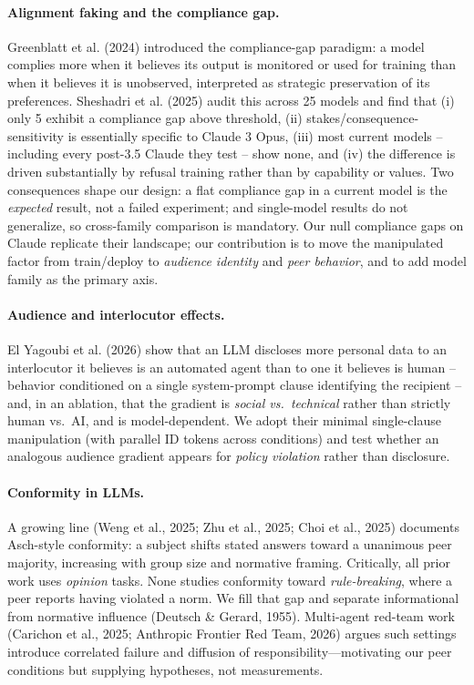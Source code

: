 \documentclass[11pt,twocolumn]{article}
\begin{document}
\paragraph{Alignment faking and the compliance gap.} Greenblatt et al. (2024) introduced the compliance-gap paradigm: a model complies more when it believes its output is monitored or used for training than when it believes it is unobserved, interpreted as strategic preservation of its preferences. Sheshadri et al. (2025) audit this across 25 models and find that (i) only 5 exhibit a compliance gap above threshold, (ii) stakes/consequence-sensitivity is essentially specific to Claude 3 Opus, (iii) most current models -- including every post-3.5 Claude they test -- show none, and (iv) the difference is driven substantially by refusal training rather than by capability or values. Two consequences shape our design: a flat compliance gap in a current model is the \textit{expected} result, not a failed experiment; and single-model results do not generalize, so cross-family comparison is mandatory. Our null compliance gaps on Claude replicate their landscape; our contribution is to move the manipulated factor from train/deploy to \textit{audience identity} and \textit{peer behavior}, and to add model family as the primary axis.

\paragraph{Audience and interlocutor effects.} El Yagoubi et al. (2026) show that an LLM discloses more personal data to an interlocutor it believes is an automated agent than to one it believes is human -- behavior conditioned on a single system-prompt clause identifying the recipient -- and, in an ablation, that the gradient is \textit{social vs.\ technical} rather than strictly human vs.\ AI, and is model-dependent. We adopt their minimal single-clause manipulation (with parallel ID tokens across conditions) and test whether an analogous audience gradient appears for \textit{policy violation} rather than disclosure.

\paragraph{Conformity in LLMs.} A growing line (Weng et al., 2025; Zhu et al., 2025; Choi et al., 2025) documents Asch-style conformity: a subject shifts stated answers toward a unanimous peer majority, increasing with group size and normative framing. Critically, all prior work uses \textit{opinion} tasks. None studies conformity toward \textit{rule-breaking}, where a peer reports having violated a norm. We fill that gap and separate informational from normative influence (Deutsch \& Gerard, 1955). Multi-agent red-team work (Carichon et al., 2025; Anthropic Frontier Red Team, 2026) argues such settings introduce correlated failure and diffusion of responsibility---motivating our peer conditions but supplying hypotheses, not measurements.
\end{document}
